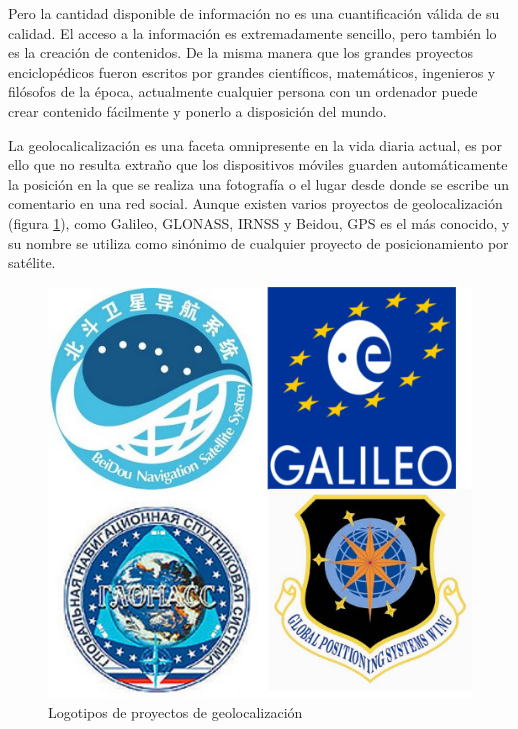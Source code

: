 Pero la cantidad disponible de información no es una cuantificación válida de su calidad. El acceso a la información es extremadamente sencillo, pero también lo es la creación de contenidos. De la misma manera que los grandes proyectos enciclopédicos fueron escritos por grandes científicos, matemáticos, ingenieros y filósofos de la época, actualmente cualquier persona con un ordenador puede crear contenido fácilmente y ponerlo a disposición del mundo.

% 


La geolocalicalización es una faceta omnipresente en la vida diaria actual, es por ello que no resulta extraño que los dispositivos móviles guarden automáticamente la posición en la que se realiza una fotografía o el lugar desde donde se escribe un comentario en una red social. Aunque existen varios proyectos de geolocalización (figura \ref{Logos_satelites}), como Galileo, \ac{GLONASS}, \ac{IRNSS} y Beidou, \ac{GPS} es el más conocido, y su nombre se utiliza como sinónimo de cualquier proyecto de posicionamiento por satélite.

\begin{figure}[hbtp]
\centering
\includegraphics[scale=0.75, fbox={\fboxrule} 4mm]{images/introduccion/Sistemas_posicionamiento_satelites.jpg}
\caption{Logotipos de proyectos de geolocalización}
\label{Logos_satelites}
\end{figure}



